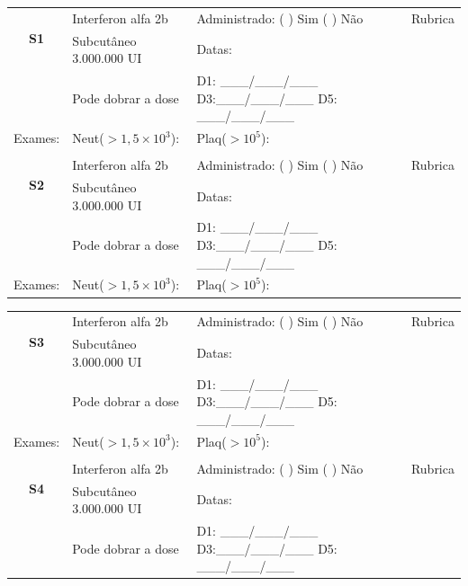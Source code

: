 \documentclass[11pt,a4paper,oldfontcommands]{memoir}
\begin{document}
\begin{center}
\begin{table}[H]
\begin{tabular}{p{1.3cm}p{4.2cm}|p{8cm}|p{}}
    \hline
    \multicolumn{1}{c|}{\multirow{2}{*}{\textbf{S1}}}&{Interferon alfa 2b}&{Administrado: (  ) Sim (  ) Não}&{Rubrica}\\
    \multicolumn{1}{c|}{}&{Subcutâneo 3.000.000 UI}&{Datas:}&\\
    \multicolumn{1}{c|}{}&{Pode dobrar a dose}&{D1: \_\_\_/\_\_\_/\_\_\_ D3:\_\_\_/\_\_\_/\_\_\_ D5: \_\_\_/\_\_\_/\_\_\_}&\\
    \hline
    {Exames:}&{Neut(\(>1,5\times10^3\)):}&{Plaq(\(>10^5\)):}&{}
    \\
    \hline
    \\
    \hline
    \multicolumn{1}{c|}{\multirow{2}{*}{\textbf{S2}}}&{Interferon alfa 2b}&{Administrado: (  ) Sim (  ) Não}&{Rubrica}\\
    \multicolumn{1}{c|}{}&{Subcutâneo 3.000.000 UI}&{Datas:}&\\
    \multicolumn{1}{c|}{}&{Pode dobrar a dose}&{D1: \_\_\_/\_\_\_/\_\_\_ D3:\_\_\_/\_\_\_/\_\_\_ D5: \_\_\_/\_\_\_/\_\_\_}&\\
    \hline
    {Exames:}&{Neut(\(>1,5\times10^3\)):}&{Plaq(\(>10^5\)):}&{}
    \\
    \hline
\end{tabular}
\end{table}
\begin{table}[H]
\begin{tabular}{p{1.3cm}p{4.2cm}|p{8cm}|p{}}
    \hline
    \multicolumn{1}{c|}{\multirow{2}{*}{\textbf{S3}}}&{Interferon alfa 2b}&{Administrado: (  ) Sim (  ) Não}&{Rubrica}\\
    \multicolumn{1}{c|}{}&{Subcutâneo 3.000.000 UI}&{Datas:}&\\
    \multicolumn{1}{c|}{}&{Pode dobrar a dose}&{D1: \_\_\_/\_\_\_/\_\_\_ D3:\_\_\_/\_\_\_/\_\_\_ D5: \_\_\_/\_\_\_/\_\_\_}&\\
    \hline
    {Exames:}&{Neut(\(>1,5\times10^3\)):}&{Plaq(\(>10^5\)):}&{}
    \\
    \hline
    \\
    \hline
    \multicolumn{1}{c|}{\multirow{2}{*}{\textbf{S4}}}&{Interferon alfa 2b}&{Administrado: (  ) Sim (  ) Não}&{Rubrica}\\
    \multicolumn{1}{c|}{}&{Subcutâneo 3.000.000 UI}&{Datas:}&\\
    \multicolumn{1}{c|}{}&{Pode dobrar a dose}&{D1: \_\_\_/\_\_\_/\_\_\_ D3:\_\_\_/\_\_\_/\_\_\_ D5: \_\_\_/\_\_\_/\_\_\_}&\\

\end{tabular}
\end{table}
\end{center}
\end{document}
